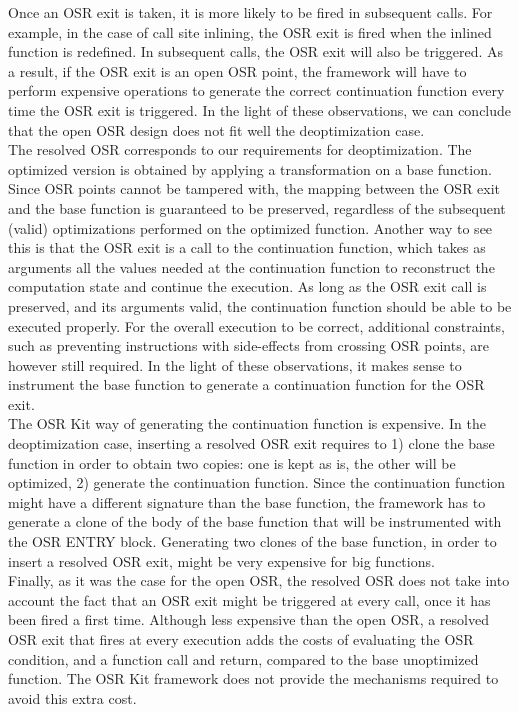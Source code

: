 Once an OSR exit is taken, it is more likely to be fired in subsequent calls.
For example, in the case of call site inlining, the OSR exit is fired when the inlined function is redefined.
In subsequent calls, the OSR exit will also be triggered.
As a result, if the OSR exit is an open OSR point, the framework will have to perform expensive operations to generate the correct continuation function every time the OSR exit is triggered.
In the light of these observations, we can conclude that the open OSR design does not fit well the deoptimization case.\\

The resolved OSR corresponds to our requirements for deoptimization.
The optimized version is obtained by applying a transformation on a base function.
Since OSR points cannot be tampered with, the mapping between the OSR exit and the base function is guaranteed to be preserved, regardless of the subsequent (valid) optimizations performed on the optimized function.
Another way to see this is that the OSR exit is a call to the continuation function, which takes as arguments all the values needed at the continuation function to reconstruct the computation state and continue the execution.
As long as the OSR exit call is preserved, and its arguments valid, the continuation function should be able to be executed properly.
For the overall execution to be correct, additional constraints, such as preventing instructions with side-effects from crossing OSR points, are however still required.
In the light of these observations, it makes sense to instrument the base function to generate a continuation function for the OSR exit.\\

The OSR Kit way of generating the continuation function is expensive.
In the deoptimization case, inserting a resolved OSR exit requires to 1) clone the base function in order to obtain two copies: one is kept as is, the other will be optimized, 2) generate the continuation function. 
Since the continuation function might have a different signature than the base function, the framework has to generate a clone of the body of the base function that will be instrumented with the OSR ENTRY block.
Generating two clones of the base function, in order to insert a resolved OSR exit, might be very expensive for big functions.\\

Finally, as it was the case for the open OSR, the resolved OSR does not take into account the fact that an OSR exit might be triggered at every call, once it has been fired a first time.
Although less expensive than the open OSR, a resolved OSR exit that fires at every execution adds the costs of evaluating the OSR condition, and a function call and return, compared to the base unoptimized function.
The OSR Kit framework does not provide the mechanisms required to avoid this extra cost.\\

